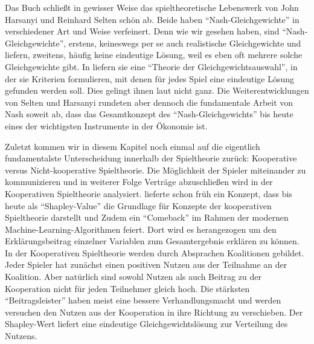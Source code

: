 Das Buch \textcite{Harsanyi1988} schließt in gewisser Weise das spieltheoretische Lebenswerk von John Harsanyi und Reinhard Selten schön ab. Beide haben "`Nash-Gleichgewichte"' in verschiedener Art und Weise verfeinert. Denn wie wir gesehen haben, sind "`Nash-Gleichgewichte"', erstens, keineswegs per se auch realistische Gleichgewichte und liefern, zweitens, häufig keine eindeutige Lösung, weil es eben oft mehrere solche Gleichgewichte gibt. In \textcite{Harsanyi1988} liefern sie eine "`Theorie der Gleichgewichtsauswahl"', in der sie Kriterien formulieren, mit denen für jedes Spiel eine eindeutige Lösung gefunden werden soll. Dies gelingt ihnen laut \textcite[S. 134]{Holler2005} nicht ganz. Die Weiterentwicklungen von Selten und Harsanyi rundeten aber dennoch die fundamentale Arbeit von Nash soweit ab, dass das Gesamtkonzept des "`Nash-Gleichgewichts"' bis heute eines der wichtigsten Instrumente in der Ökonomie ist.

Zuletzt kommen wir in diesem Kapitel noch einmal auf die eigentlich fundamentalste Unterscheidung innerhalb der Spieltheorie zurück: Kooperative versus Nicht-kooperative Spieltheorie. Die Möglichkeit der Spieler miteinander zu kommunizieren und in weiterer Folge Verträge abzuschließen wird in der Kooperativen Spieltheorie analysiert. \textcite{Shapley1953} lieferte schon früh ein Konzept, dass bis heute als "`Shapley-Value"' die Grundlage für Konzepte der kooperativen Spieltheorie darstellt und Zudem ein "`Comeback"' im Rahmen der modernen Machine-Learning-Algorithmen feiert. Dort wird es herangezogen um den Erklärungsbeitrag einzelner Variablen zum Gesamtergebnis erklären zu können. In der Kooperativen Spieltheorie werden durch Absprachen Koalitionen gebildet. Jeder Spieler hat zunächst einen positiven Nutzen aus der Teilnahme an der Koalition. Aber natürlich sind sowohl Nutzen als auch Beitrag zu der Kooperation nicht für jeden Teilnehmer gleich hoch. Die stärksten "`Beitragsleister"' haben meist eine bessere Verhandlungsmacht und werden versuchen den Nutzen aus der Kooperation in ihre Richtung zu verschieben. Der Shapley-Wert liefert eine eindeutige Gleichgewichtslösung zur Verteilung des Nutzens. 

